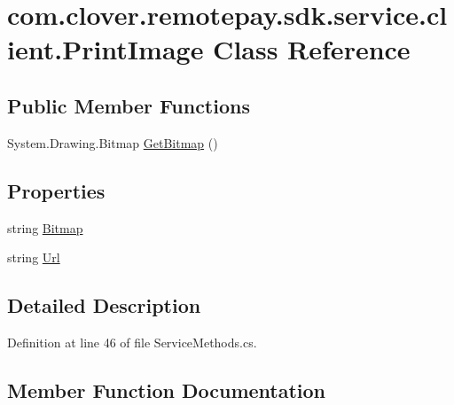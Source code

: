 \hypertarget{classcom_1_1clover_1_1remotepay_1_1sdk_1_1service_1_1client_1_1_print_image}{}\section{com.\+clover.\+remotepay.\+sdk.\+service.\+client.\+Print\+Image Class Reference}
\label{classcom_1_1clover_1_1remotepay_1_1sdk_1_1service_1_1client_1_1_print_image}
\subsection*{Public Member Functions}
\begin{DoxyCompactItemize}
\item 
System.\+Drawing.\+Bitmap \hyperlink{classcom_1_1clover_1_1remotepay_1_1sdk_1_1service_1_1client_1_1_print_image_aeab3266525d34c8bd624849e7e9c89fe}{Get\+Bitmap} ()
\end{DoxyCompactItemize}
\subsection*{Properties}
\begin{DoxyCompactItemize}
\item 
string \hyperlink{classcom_1_1clover_1_1remotepay_1_1sdk_1_1service_1_1client_1_1_print_image_aae223ae1c9429c6bd760ca087fe53550}{Bitmap}
\item 
string \hyperlink{classcom_1_1clover_1_1remotepay_1_1sdk_1_1service_1_1client_1_1_print_image_a58195c57aaa9e12502f8a958848af7ce}{Url}
\end{DoxyCompactItemize}


\subsection{Detailed Description}


Definition at line 46 of file Service\+Methods.\+cs.



\subsection{Member Function Documentation}
\mbox{\label{classcom_1_1clover_1_1remotepay_1_1sdk_1_1service_1_1client_1_1_print_image_aeab3266525d34c8bd624849e7e9c89fe}} 
